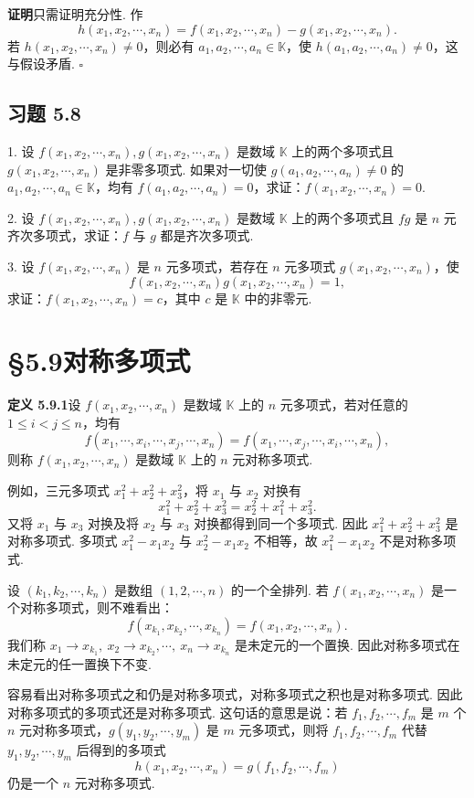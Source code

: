 \documentclass[UTF8, 12pt, fontset=fandol, oneside]{ctexart}
\begin{document}
\noindent\textbf{证明}\quad 只需证明充分性. 作
\[
h(x_1,x_2,\cdots,x_n)=f(x_1,x_2,\cdots,x_n)-g(x_1,x_2,\cdots,x_n).
\]
若 $h(x_1,x_2,\cdots,x_n)\neq 0$，则必有 $a_1,a_2,\cdots,a_n\in\mathbb{K}$，使 $h(a_1,a_2,\cdots,a_n)\neq 0$，这与假设矛盾. $\square$

\subsection*{习题 5.8}

1. 设 $f(x_1,x_2,\cdots,x_n),g(x_1,x_2,\cdots,x_n)$ 是数域 $\mathbb{K}$ 上的两个多项式且 $g(x_1,x_2,\cdots,x_n)$ 是非零多项式. 如果对一切使 $g(a_1,a_2,\cdots,a_n)\neq 0$ 的 $a_1,a_2,\cdots,a_n\in\mathbb{K}$，均有 $f(a_1,a_2,\cdots,a_n)=0$，求证：$f(x_1,x_2,\cdots,x_n)=0$.

2. 设 $f(x_1,x_2,\cdots,x_n),g(x_1,x_2,\cdots,x_n)$ 是数域 $\mathbb{K}$ 上的两个多项式且 $fg$ 是 $n$ 元齐次多项式，求证：$f$ 与 $g$ 都是齐次多项式.

3. 设 $f(x_1,x_2,\cdots,x_n)$ 是 $n$ 元多项式，若存在 $n$ 元多项式 $g(x_1,x_2,\cdots,x_n)$，使
\[
f(x_1,x_2,\cdots,x_n)g(x_1,x_2,\cdots,x_n)=1,
\]
求证：$f(x_1,x_2,\cdots,x_n)=c$，其中 $c$ 是 $\mathbb{K}$ 中的非零元.

\section*{§5.9\quad 对称多项式}

\noindent\textbf{定义 5.9.1}\quad 设 $f(x_1,x_2,\cdots,x_n)$ 是数域 $\mathbb{K}$ 上的 $n$ 元多项式，若对任意的 $1\leq i<j\leq n$，均有
\[
f(x_1,\cdots,x_i,\cdots,x_j,\cdots,x_n)=f(x_1,\cdots,x_j,\cdots,x_i,\cdots,x_n),
\]
则称 $f(x_1,x_2,\cdots,x_n)$ 是数域 $\mathbb{K}$ 上的 $n$ 元对称多项式.

例如，三元多项式 $x_1^2+x_2^2+x_3^2$，将 $x_1$ 与 $x_2$ 对换有
\[
x_1^2+x_2^2+x_3^2=x_2^2+x_1^2+x_3^2.
\]
又将 $x_1$ 与 $x_3$ 对换及将 $x_2$ 与 $x_3$ 对换都得到同一个多项式. 因此 $x_1^2+x_2^2+x_3^2$ 是对称多项式. 多项式 $x_1^2-x_1x_2$ 与 $x_2^2-x_1x_2$ 不相等，故 $x_1^2-x_1x_2$ 不是对称多项式.

设 $(k_1,k_2,\cdots,k_n)$ 是数组 $(1,2,\cdots,n)$ 的一个全排列. 若 $f(x_1,x_2,\cdots,x_n)$ 是一个对称多项式，则不难看出：
\[
f(x_{k_1},x_{k_2},\cdots,x_{k_n})=f(x_1,x_2,\cdots,x_n).
\]
我们称 $x_1\to x_{k_1},\ x_2\to x_{k_2},\cdots,\ x_n\to x_{k_n}$ 是未定元的一个置换. 因此对称多项式在未定元的任一置换下不变.

容易看出对称多项式之和仍是对称多项式，对称多项式之积也是对称多项式. 因此对称多项式的多项式还是对称多项式. 这句话的意思是说：若 $f_1,f_2,\cdots,f_m$ 是 $m$ 个 $n$ 元对称多项式，$g(y_1,y_2,\cdots,y_m)$ 是 $m$ 元多项式，则将 $f_1,f_2,\cdots,f_m$ 代替 $y_1,y_2,\cdots,y_m$ 后得到的多项式
\[
h(x_1,x_2,\cdots,x_n)=g(f_1,f_2,\cdots,f_m)
\]
仍是一个 $n$ 元对称多项式.
\end{document}
